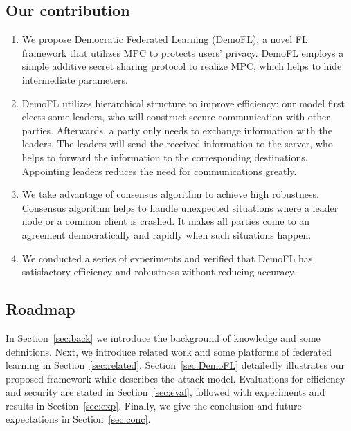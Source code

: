 \subsection{Our contribution}
\begin{enumerate}
    \item We propose Democratic Federated Learning (DemoFL), a novel FL framework that utilizes MPC to protects users' privacy. DemoFL employs a simple additive secret sharing protocol to realize MPC, which helps to hide intermediate parameters.

    \item DemoFL utilizes hierarchical structure to improve efficiency: our model first elects some leaders, who will construct secure communication with other parties. Afterwards, a party only needs to exchange information with the leaders. The leaders will send the received information to the server, who helps to forward the information to the corresponding destinations. Appointing leaders reduces the need for communications greatly.

    \item We take advantage of consensus algorithm to achieve high robustness. Consensus algorithm helps to handle unexpected situations where a leader node or a common client is crashed. It makes all parties come to an agreement democratically and rapidly when such situations happen.

    \item We conducted a series of experiments and verified that DemoFL has satisfactory efficiency and robustness without reducing accuracy.

\end{enumerate}

\subsection{Roadmap} In Section~\ref{sec:back} we introduce the background of knowledge and some definitions. Next, we introduce related work and some platforms of federated learning in Section~\ref{sec:related}. Section~\ref{sec:DemoFL} detailedly illustrates our proposed framework while describes the attack model. Evaluations for efficiency and security are stated in Section~\ref{sec:eval}, followed with experiments and results in Section~\ref{sec:exp}. Finally, we give the conclusion and future expectations in Section~\ref{sec:conc}.